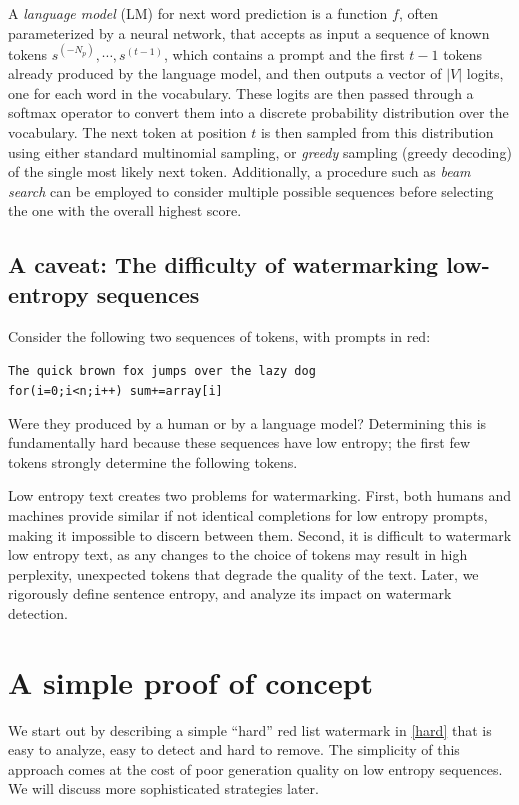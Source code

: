 \documentclass{article}
\theoremstyle{plain}
\theoremstyle{definition}
\theoremstyle{remark}
\begin{document}
A {\em language model} (LM) for next word prediction is a function $f$, often parameterized by a neural network, that accepts as input a sequence of known tokens $s^{(-N_p)}, \cdots, s^{(t-1)}$, which contains a prompt and the first $t-1$ tokens already produced by the language model, and then outputs a vector of $|V|$ logits, one for each word in the vocabulary. These logits are then passed through a softmax operator to convert them into a discrete probability distribution over the vocabulary.
%
The next token at position $t$ is then sampled from this distribution using either standard multinomial sampling, or \textit{greedy} sampling (greedy decoding) of the single most likely next token. Additionally, a procedure such as {\em beam search} can be employed to consider multiple possible sequences before selecting the one with the overall highest score.


\subsection{A caveat: The difficulty of watermarking low-entropy sequences} \label{entropyproblem}
Consider the following two sequences of tokens, with prompts in red:
\begin{center}
\vspace{-2mm}
\texttt{{\color{red}The\!\! quick\!\! brown}\!\! fox\!\! jumps\! over\! the\!\! lazy\!\! dog}\\
\texttt{{\color{red}for(i=}0;i<n;i++) sum+=array[i]}
\vspace{-2mm}
\end{center}
Were they produced by a human or by a language model?
Determining this is fundamentally hard because these sequences have low entropy; the first few tokens strongly determine the following tokens.  

Low entropy text creates two problems for watermarking.  First, both humans and machines provide similar if not identical completions for low entropy prompts, making it impossible to discern between them.  Second, it is difficult to watermark low entropy text, as any changes to the choice of tokens may result in high perplexity, unexpected tokens that degrade the quality of the text. 
Later, we rigorously define sentence entropy, and analyze its impact on watermark detection.










\section{A simple proof of concept}
We start out by describing a simple ``hard'' red list watermark in \cref{hard} that is easy to analyze, easy to detect and hard to remove. The simplicity of this approach comes at the cost of poor generation quality on low entropy sequences. We will discuss more sophisticated strategies later.
\end{document}
